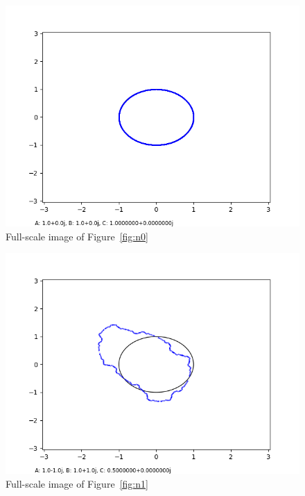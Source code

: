 \documentclass[12pt,a4paper,reqno,parskip=full]{amsart}
\numberwithin{equation}{section}
\theoremstyle{plain}
\theoremstyle{definition}
\begin{document}
\begin{figure}[H]
    \centering
    \includegraphics[width=\textwidth]{images/nn/a0 b0 h100 d0.001 fixed xy.png}
    \caption{Full-scale image of Figure~\ref{fig:n0}}
\end{figure}

\begin{figure}[H]
    \centering
    \includegraphics[width=\textwidth]{images/nn/a-1 b1 h30 d0.01.png}
    \caption{Full-scale image of Figure~\ref{fig:n1}}
\end{figure}
\end{document}
